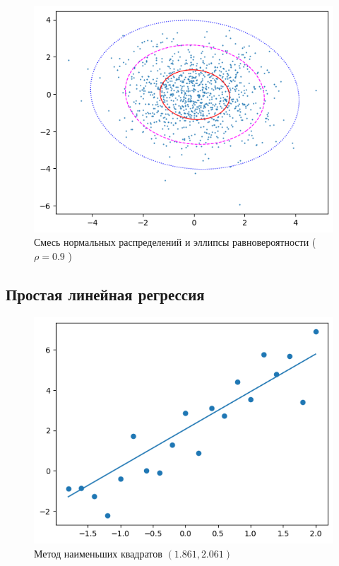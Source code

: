 \documentclass[12pt,a4paper]{article}
\begin{document}
	\begin{figure}[htbp!]
		\begin{center}
			\includegraphics[width = 0.8\linewidth]{graphics/lab5_ellips_3.png}
			\caption{Смесь нормальных распределений и эллипсы равновероятности
			( \( \rho = 0.9 \) )}
		\end{center}
	\end{figure}

	\clearpage

	\subsection{Простая линейная регрессия}

	\begin{figure}[htbp!]
		\begin{center}
			\includegraphics[width = 1\linewidth]{graphics/lab6_sq.png}
			\caption{Метод наименьших квадратов \( ( 1.861, 2.061) \)}
		\end{center}
	\end{figure}
\end{document}
